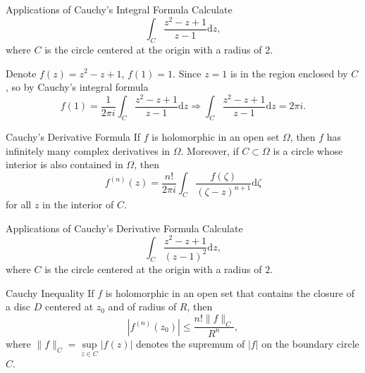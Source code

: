 \begin{example}{Applications of Cauchy's Integral Formula}{}
  Calculate
  \begin{equation}
    \int_C \frac{z^2 - z + 1}{z - 1}\mathrm{d} z,
  \end{equation}
  where $C$ is the circle centered at the origin with a radius of $2$.
\end{example}

\begin{solution}
  Denote $f(z) = z^2 - z + 1$, $f(1) = 1$.
  Since $z = 1$ is in the region enclosed by $C$, so by Cauchy's integral formula
  \begin{equation}
    f(1) = \frac{1}{2\pi i}\int_C \frac{z^2 - z + 1}{z - 1}\mathrm{d} z
    \Rightarrow \int_C \frac{z^2 - z + 1}{z - 1}\mathrm{d}z = 2 \pi i.
  \end{equation}
\end{solution}

\begin{corollary}{Cauchy's Derivative Formula}{}
  If $f$ is holomorphic in an open set $\Omega$,
  then $f$ has infinitely many complex derivatives in $\Omega$.
  Moreover, if $C \subset \Omega$ is a circle whose interior is also contained in $\Omega$,
  then
  \begin{equation}
    f^{(n)}(z) = \frac{n!}{2 \pi i} \int_C \frac{f(\zeta)}{(\zeta - z)^{n+1}}\mathrm{d} \zeta
  \end{equation}
  for all $z$ in the interior of $C$.
\end{corollary}

\begin{example}{Applications of Cauchy's Derivative Formula}{}
  Calculate
  \begin{equation}
    \int_C \frac{z^2 - z + 1}{(z-1)^2}\mathrm{d} z,
  \end{equation}
  where $C$ is the circle centered at the origin with a radius of $2$.
\end{example}

\begin{solution}
  
\end{solution}

\begin{corollary}{Cauchy Inequality}{}
  If $f$ is holomorphic in an open set that contains the closure of a disc $D$
  centered at $z_0$ and of radius of $R$, then
  \begin{equation}
    |f^{(n)}(z_0)| \leq \frac{n! \|f\|_C}{R^n},
  \end{equation}
  where $\|f\|_C = \sup \limits_{z \in C}|f(z)|$ denotes the supremum of $|f|$
  on the boundary circle $C$.
\end{corollary}

